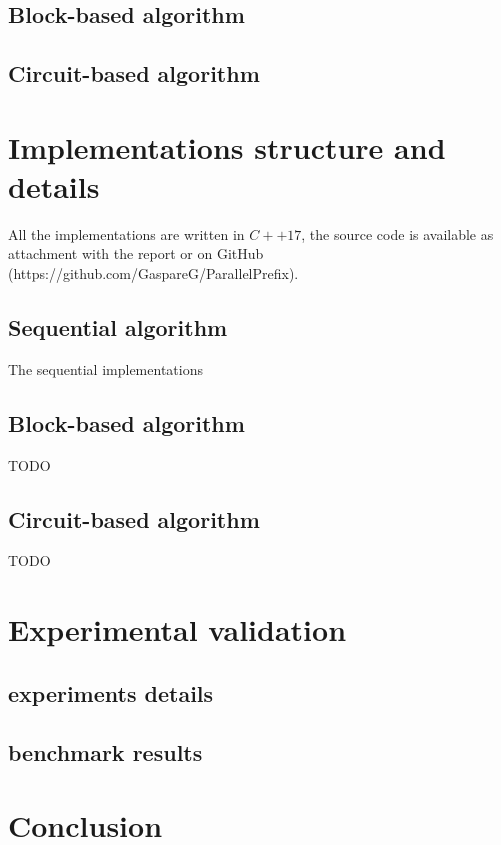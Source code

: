 \documentclass{article}
\begin{document}
 
\subsection{Block-based algorithm}


\subsection{Circuit-based algorithm}

 
\section{Implementations structure and details}

All the implementations are written in $C++17$, the source code is available as attachment with the report or on GitHub (https://github.com/GaspareG/ParallelPrefix).


\subsection{Sequential algorithm}

The sequential implementations 

\subsection{Block-based algorithm}

TODO

\subsection{Circuit-based algorithm}

TODO

\section{Experimental validation}


\subsection{experiments details}

\subsection{benchmark results}

\section{Conclusion}


\end{document}
